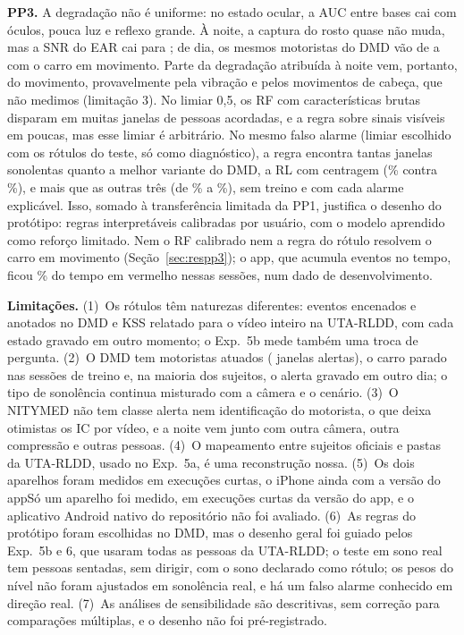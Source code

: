\documentclass[conference]{IEEEtran}
\newif\ifMesmaVersaoApp
\begin{document}
\textbf{PP3.} A degradação não é uniforme: no estado ocular, a AUC entre bases cai com óculos, pouca luz e reflexo grande. À noite, a captura do rosto quase não muda, mas a SNR do EAR cai para \ExpSeisSNRNoite; de dia, os mesmos motoristas do DMD vão de \ExpSeisSNRDMDParado{} a \ExpSeisSNRDMDMovimento{} com o carro em movimento. Parte da degradação atribuída à noite vem, portanto, do movimento, provavelmente pela vibração e pelos movimentos de cabeça, que não medimos (limitação 3). No limiar 0,5, os RF com características brutas disparam em muitas janelas de pessoas acordadas, e a regra sobre sinais visíveis em poucas, mas esse limiar é arbitrário. No mesmo falso alarme (limiar escolhido com os rótulos do teste, só como diagnóstico), a regra encontra tantas janelas sonolentas quanto a melhor variante do DMD, a RL com centragem (\ExpSeisDisparoRegraUTASonolento\% contra \ExpCincoBLROpRegraSensCCentrada\%), e mais que as outras três (de \ExpCincoBOpRegraSensCBruta\% a \ExpCincoBLROpRegraSensCBruta\%), sem treino e com cada alarme explicável. Isso, somado à transferência limitada da PP1, justifica o desenho do protótipo: regras interpretáveis calibradas por usuário, com o modelo aprendido como reforço limitado. Nem o RF calibrado nem a regra do rótulo resolvem o carro em movimento (Seção~\ref{sec:respp3}); o app, que acumula eventos no tempo, ficou \AppDMDVermelhoDirecaoReal\% do tempo em vermelho nessas sessões, num dado de desenvolvimento.

\textbf{Limitações.} (1)~Os rótulos têm naturezas diferentes: eventos encenados e anotados no DMD e KSS relatado para o vídeo inteiro na UTA-RLDD, com cada estado gravado em outro momento; o Exp.~5b mede também uma troca de pergunta. (2)~O DMD tem \BaseDMDSujeitos{} motoristas atuados (\BaseDMDJanelasAlerta{} janelas alertas), o carro parado nas sessões de treino e, na maioria dos sujeitos, o alerta gravado em outro dia; o tipo de sonolência continua misturado com a câmera e o cenário. (3)~O NITYMED não tem classe alerta nem identificação do motorista, o que deixa otimistas os IC por vídeo, e a noite vem junto com outra câmera, outra compressão e outras pessoas. (4)~O mapeamento entre sujeitos oficiais e pastas da UTA-RLDD, usado no Exp.~5a, é uma reconstrução nossa. (5)~\ifSamsungMedido Os dois aparelhos foram medidos em execuções curtas\ifMesmaVersaoApp\else, o iPhone ainda com a versão \CelularIPhoneVersaoApp{} do app\fi\else Só um aparelho foi medido, em \CelularIPhoneExecucoes{} execuções curtas da versão \CelularIPhoneVersaoApp{} do app\fi, e o aplicativo Android nativo do repositório não foi avaliado. (6)~As regras do protótipo foram escolhidas no DMD, mas o desenho geral foi guiado pelos Exp.~5b e 6, que usaram todas as pessoas da UTA-RLDD; o teste em sono real tem \AppUTASujeitos{} pessoas sentadas, sem dirigir, com o sono declarado como rótulo; os pesos do nível não foram ajustados em sonolência real, e há um falso alarme conhecido em direção real. (7)~As análises de sensibilidade são descritivas, sem correção para comparações múltiplas, e o desenho não foi pré-registrado.
\end{document}
